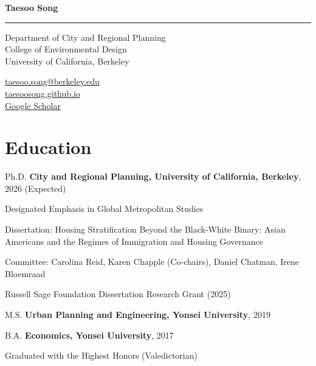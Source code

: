 \documentclass[11pt,letterpaper]{article}
\newcommand{\spitem}{\Needspace{2.6\baselineskip}\item} %
\newcommand{\term}[1]{(#1)}
\newcommand{\namefont}[1]{{\normalfont\bfseries\Huge #1}}
\begin{document}
\raggedright

\namefont{Taesoo Song}
\noindent\rule{\linewidth}{0.8pt}

\begin{minipage}[t]{0.66\textwidth}
Department of City and Regional Planning\\
College of Environmental Design\\
University of California, Berkeley
\end{minipage}
\begin{minipage}[t]{0.33\textwidth}
\raggedleft
\href{mailto:taesoo.song@berkeley.edu}{taesoo.song@berkeley.edu}\\
\href{https://taesoosong.github.io}{taesoosong.github.io}\\
\href{https://scholar.google.com/citations?user=xM5Rc-EAAAAJ}{Google Scholar}
\end{minipage}

\section{Education}
\begin{tablist}
  \item[Ph.D.] \tab{}\textbf{City and Regional Planning, University of California, Berkeley}, 2026 (Expected)
    \begin{subpoints}
      \spitem Designated Emphasis in Global Metropolitan Studies
    \end{subpoints}
    \begin{subpoints2}
      \spitem Dissertation: Housing Stratification Beyond the Black-White Binary: Asian Americans and the Regimes of Immigration and Housing Governance
      \spitem Committee: Carolina Reid, Karen Chapple (Co-chairs), Daniel Chatman, Irene Bloemraad
      \spitem Russell Sage Foundation Dissertation Research Grant \term{2025}
    \end{subpoints2}

  \item[M.S.] \tab{}\textbf{Urban Planning and Engineering, Yonsei University}, 2019

  \item[B.A.] \tab{}\textbf{Economics, Yonsei University}, 2017
    \begin{subpoints}
      \spitem Graduated with the Highest Honors \term{Valedictorian}
    \end{subpoints}
\end{tablist}
\end{document}
